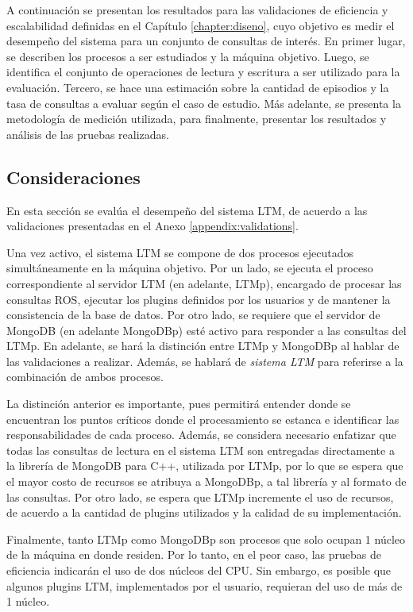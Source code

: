 A continuación se presentan los resultados para las validaciones de eficiencia y escalabilidad definidas en el Capítulo \ref{chapter:diseno}, cuyo objetivo es medir el desempeño del sistema para un conjunto de consultas de interés. En primer lugar, se describen los procesos a ser estudiados y la máquina objetivo. Luego, se identifica el conjunto de operaciones de lectura y escritura a ser utilizado para la evaluación. Tercero, se hace una estimación sobre la cantidad de episodios y la tasa de consultas a evaluar según el caso de estudio. Más adelante, se presenta la metodología de medición utilizada, para finalmente, presentar los resultados y análisis de las pruebas realizadas.

\subsection{Consideraciones}

En esta sección se evalúa el desempeño del sistema LTM, de acuerdo a las validaciones  presentadas en el Anexo \ref{appendix:validations}.

Una vez activo, el sistema LTM se compone de dos procesos ejecutados simultáneamente en la máquina objetivo. Por un lado, se ejecuta el proceso correspondiente al servidor LTM (en adelante, LTMp), encargado de procesar las consultas ROS, ejecutar los plugins definidos por los usuarios y de mantener la consistencia de la base de datos. Por otro lado, se requiere que el servidor de MongoDB (en adelante MongoDBp) esté activo para responder a las consultas del LTMp. En adelante, se hará la distinción entre LTMp y MongoDBp al hablar de las validaciones a realizar. Además, se hablará de \textit{sistema LTM} para referirse a la combinación de ambos procesos.

La distinción anterior es importante, pues permitirá entender donde se encuentran los puntos críticos donde el procesamiento se estanca e identificar las responsabilidades de cada proceso. Además, se considera necesario enfatizar que todas las consultas de lectura en el sistema LTM son entregadas directamente a la librería de MongoDB para C++, utilizada por LTMp, por lo que se espera que el mayor costo de recursos se atribuya a MongoDBp, a tal librería y al formato de las consultas. Por otro lado, se espera que LTMp incremente el uso de recursos, de acuerdo a la cantidad de plugins utilizados y la calidad de su implementación.

Finalmente, tanto LTMp como MongoDBp son procesos que solo ocupan 1 núcleo de la máquina en donde residen. Por lo tanto, en el peor caso, las pruebas de eficiencia indicarán el uso de dos núcleos del CPU. Sin embargo, es posible que algunos plugins LTM, implementados por el usuario, requieran del uso de más de 1 núcleo.

